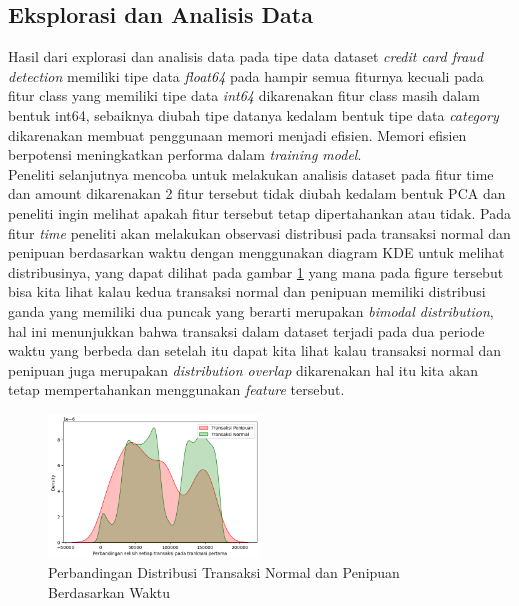 \subsection{Eksplorasi dan Analisis Data}
Hasil dari explorasi dan analisis data pada tipe data  dataset \textit{credit card fraud detection} memiliki tipe data \textit{float64} pada hampir semua fiturnya kecuali pada fitur class yang memiliki tipe data \textit{int64} dikarenakan fitur class masih dalam bentuk int64, sebaiknya diubah tipe datanya kedalam bentuk tipe data \textit{category} dikarenakan membuat penggunaan memori menjadi efisien\cite{mckinney2024pandas}. Memori efisien  berpotensi meningkatkan performa dalam \textit{training model}. \\
Peneliti selanjutnya mencoba untuk melakukan analisis dataset pada fitur time dan amount dikarenakan 2 fitur tersebut tidak diubah kedalam bentuk PCA dan peneliti ingin melihat apakah fitur tersebut tetap dipertahankan atau tidak. Pada fitur \textit{time} peneliti akan melakukan observasi distribusi pada transaksi normal dan penipuan berdasarkan waktu dengan menggunakan diagram KDE untuk melihat distribusinya, yang dapat dilihat pada gambar \ref{fig:3.Perbandingan Distribusi Transaksi Normal dan Penipuan Berdasarkan Waktu} yang mana pada figure tersebut bisa kita lihat kalau kedua transaksi normal dan penipuan memiliki distribusi ganda yang memiliki dua puncak yang berarti merupakan \textit{bimodal distribution}\cite{gonick1993cartoon}, hal ini menunjukkan bahwa transaksi dalam dataset terjadi pada dua periode waktu yang berbeda dan setelah itu dapat kita lihat kalau transaksi normal dan penipuan juga merupakan \textit{distribution overlap}\cite{gonick1993cartoon} dikarenakan hal itu kita akan tetap mempertahankan menggunakan \textit{feature} tersebut. 
\begin{figure}[H]
	\centering
	\includegraphics[width=0.5\textwidth]{figure/distribusiwaktunormalpenipuan.png}
	\caption{Perbandingan Distribusi Transaksi Normal dan Penipuan Berdasarkan Waktu}
	\label{fig:3.Perbandingan Distribusi Transaksi Normal dan Penipuan Berdasarkan Waktu}
\end{figure}
